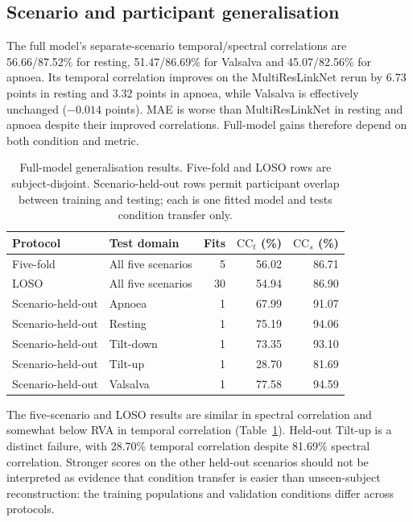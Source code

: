 \documentclass[11pt,a4paper]{article}
\newcommand{\cct}{\mathrm{CC}_{t}}
\newcommand{\ccs}{\mathrm{CC}_{s}}
\begin{document}
\subsection{Scenario and participant generalisation}

The full model's separate-scenario temporal/spectral correlations are 56.66/87.52\% for
resting, 51.47/86.69\% for Valsalva and 45.07/82.56\% for apnoea. Its temporal correlation
improves on the MultiResLinkNet rerun by 6.73 points in resting and 3.32 points in apnoea,
while Valsalva is effectively unchanged ($-0.014$ points). MAE is worse than MultiResLinkNet
in resting and apnoea despite their improved correlations. Full-model gains therefore depend
on both condition and metric.

\begin{table}[htbp]\centering\small
\caption{Full-model generalisation results. Five-fold and LOSO rows are subject-disjoint.
Scenario-held-out rows permit participant overlap between training and testing; each is one
fitted model and tests condition transfer only.}
\label{tab:generalisation}
\begin{tabular}{llrrr}\toprule
Protocol & Test domain & Fits & $\cct$ (\%) & $\ccs$ (\%)\\\midrule
Five-fold & All five scenarios & 5 & 56.02 & 86.71\\
LOSO & All five scenarios & 30 & 54.94 & 86.90\\\midrule
Scenario-held-out & Apnoea & 1 & 67.99 & 91.07\\
Scenario-held-out & Resting & 1 & 75.19 & 94.06\\
Scenario-held-out & Tilt-down & 1 & 73.35 & 93.10\\
Scenario-held-out & Tilt-up & 1 & 28.70 & 81.69\\
Scenario-held-out & Valsalva & 1 & 77.58 & 94.59\\\bottomrule
\end{tabular}
\end{table}

The five-scenario and LOSO results are similar in spectral correlation and somewhat below
RVA in temporal correlation (Table~\ref{tab:generalisation}). Held-out Tilt-up is a distinct
failure, with 28.70\% temporal correlation despite 81.69\% spectral correlation. Stronger
scores on the other held-out scenarios should not be interpreted as evidence that condition
transfer is easier than unseen-subject reconstruction: the training populations and
validation conditions differ across protocols.
\end{document}

